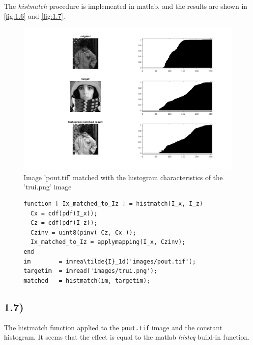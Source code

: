 \documentclass[a4paper]{article}
\begin{document}
The \textit{histmatch} procedure is implemented in matlab, and the results are shown in \autoref{fig:1.6} and \autoref{fig:1.7}.


\begin{figure}[h!]
  \centering
  \includegraphics[width=0.6\linewidth, trim={50 30 50 30 }, clip=true]{./1_6.png}
  \caption{Image 'pout.tif' matched with the histogram characteristics of the 'trui.png' image}
  \label{fig:1.6}
\end{figure}

\begin{figure}[h!]
  \begin{lstlisting}[caption='cdf histmatch implementation']
function [ Ix_matched_to_Iz ] = histmatch(I_x, I_z)
  Cx = cdf(pdf(I_x));
  Cz = cdf(pdf(I_z));
  Czinv = uint8(pinv( Cz, Cx ));
  Ix_matched_to_Iz = applymapping(I_x, Czinv);
end
im        = imrea\tilde{I}_1d('images/pout.tif');
targetim  = imread('images/trui.png');
matched   = histmatch(im, targetim);\end{lstlisting}
\end{figure}



\newpage
\subsection*{1.7)}

The histmatch function applied to the \texttt{pout.tif} image and the constant histogram. It seems that the effect is equal to the matlab \textit{histeq} build-in function.
\end{document}
